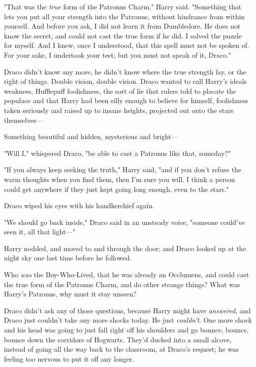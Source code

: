 "That was the \emph{true} form of the Patronus Charm," Harry said. "Something 
that lets you put all your strength into the Patronus, without hindrance from 
within yourself. And before you ask, I did not learn it from Dumbledore. He 
does not know the secret, and could not cast the true form if he did. I solved 
the puzzle for myself. And I knew, once I understood, that this spell must not 
be spoken of. For your sake, I undertook your test; but you must not speak of 
it, Draco."

Draco didn't know any more, he didn't know where the true strength lay, or the 
right of things. Double vision, double vision. Draco wanted to call Harry's 
ideals weakness, Hufflepuff foolishness, the sort of lie that rulers told to 
placate the populace and that Harry had been silly enough to believe for 
himself, foolishness taken seriously and raised up to insane heights, projected 
out onto the stars themselves---

Something beautiful and hidden, mysterious and bright---

"Will I," whispered Draco, "be able to cast a Patronus like that, someday?"

"If you always keep seeking the truth," Harry said, "and if you don't refuse 
the warm thoughts when you find them, then I'm sure you will. I think a person 
could get anywhere if they just kept going long enough, even to the stars."

Draco wiped his eyes with his handkerchief again.

"We should go back inside," Draco said in an unsteady voice, "someone could've 
seen it, all that light---"

Harry nodded, and moved to and through the door; and Draco looked up at the 
night sky one last time before he followed.

Who \emph{was} the Boy-Who-Lived, that he was already an Occlumens, and could 
cast the true form of the Patronus Charm, and do other strange things? What was 
Harry's Patronus, why must it stay unseen?

Draco didn't ask any of those questions, because Harry might have 
\emph{answered}, and Draco just couldn't take any more shocks today. He just 
\emph{couldn't}. One more shock and his head was going to just fall right off 
his shoulders and go bounce, bounce, bounce down the corridors of Hogwarts.
\sbreak
They'd ducked into a small alcove, instead of going all the way back to the 
classroom, at Draco's request; he was feeling too nervous to put it off any 
longer.

